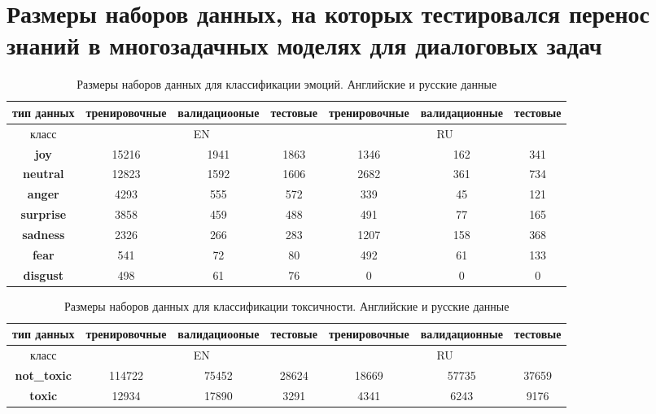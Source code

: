 \section{Размеры наборов данных, на которых тестировался перенос знаний в многозадачных моделях для диалоговых задач}
\label{tr-ag-sizes}
\begin{table}[t]
\label{emo_sizes_tr-ag}
\caption{Размеры наборов данных для классификации эмоций. Английские и русские данные}
\begin{tabular}{|c||c|c|c|c|c|c|} \hline
{тип данных} & {тренировочные} & {валидациооные} & {тестовые} & {тренировочные} & {валидационные} & {тестовые} \\ \hline
{класс} & \multicolumn{3}{c|}{EN} & \multicolumn{3}{c|}{RU} \\ \hline \hline
\textbf{joy}& 15216 & 1941 & 1863 & 1346 & 162 & 341 \\ \hline
  \textbf{neutral}& 12823 & 1592 & 1606 & 2682 & 361 & 734 \\ \hline
  \textbf{anger}& 4293 & 555 & 572 & 339 & 45 & 121 \\ \hline
  \textbf{surprise}& 3858 & 459 & 488 & 491 & 77 & 165 \\ \hline
  \textbf{sadness}& 2326 & 266 & 283 & 1207 & 158 & 368 \\ \hline
  \textbf{fear}& 541 & 72 & 80 & 492 & 61 & 133 \\ \hline
  \textbf{disgust}& 498 & 61 & 76 & 0 & 0 & 0 \\ \hline
\end{tabular}
\end{table}


\begin{table}[t]
\caption{Размеры наборов данных для классификации токсичности. Английские и русские данные}
\label{toxic_sizes_tr-ag}
\begin{tabular}{|c||c|c|c|c|c|c|} \hline
{тип данных} & {тренировочные} & {валидациооные} & {тестовые} & {тренировочные} & {валидационные} & {тестовые} \\ \hline
{класс} & \multicolumn{3}{c|}{EN} & \multicolumn{3}{c|}{RU} \\ \hline \hline
\textbf{not\_toxic}& 114722 &75452&28624 &18669 & 57735&37659 \\ \hline 
\textbf{toxic}& 12934 &17890 &3291 & 4341 & 6243&9176 \\ \hline 
\end{tabular}
\end{table}

